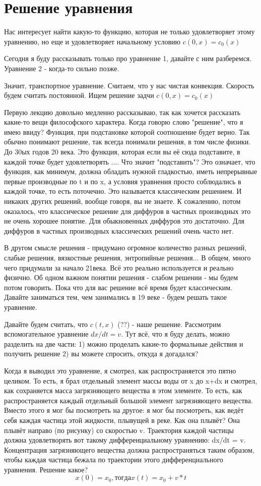 \section{Решение уравнения}
Нас интересует найти какую-то функцию, которая не только удовлетворяет этому уравнению, но еще и удовлетворяет начальному условию $c(0, x) = c_0(x)$

Сегодня я буду рассказывать только про уравнение 1, давайте с ним разберемся. Уравнение 2 - когда-то сильно позже.

Значит, транспортное уравнение. Считаем, что у нас чистая конвекция. Скорость будем считать постоянной. Ищем решение задчи $c(0,x) = c_0(x)$

Первую лекцию довольно медленно рассказываю, так как хочется рассказать какие-то вещи философского характера. Когда говорю слово "решение", что я имею ввиду? Функция, при подстановке которой соотношение будет верно. Так обычно понимают решение, так всегда понимали решения, в том числе физики. До 30ых годов 20 века. Это функция, которая если вы её сюда подставите, в каждой точке будет удовлетворять ....
Что значит "подставить"? Это означает, что функция, как минимум, должна обладать нужной гладкостью, иметь непрерывные первые производные по t и по x, а условия уравнения просто соблюдались в каждой точке, то есть поточечно. Это называется классическим решением. И никаких других решений, вообще говоря, вы не знаете. К сожалению, потом оказалось, что классическое решение для диффуров в частных производных это не очень хорошее понятие. Для обыкновенных диффуров это достаточно. Для диффуров в частных производных классических решений очень часто нет.

В другом смысле решения - придумано огромное количество разных решений, слабые решения, вязкостные решения, энтропийные решения... В общем, много чего придумали за начало 21века. Всё это реально используется и реально физично.
Об одном важном понятии решения - слабом решении - мы будем потом говорить. Пока что для вас решение всё время будет классическим. Давайте заниматься тем, чем занимались в 19 веке - будем решать такое уравнение.

Давайте будем считать, что $c(t,x)$ (??) - наше решение. Рассмотрим вспомогательное уравнение $dx/dt = v$. Тут всё, что я буду делать, можно разделить на две части:
1) можно проделать какие-то формальные действия и получить решение
2) вы можете спросить, откуда я догадался?

Когда я выводил это уравнение, я смотрел, как распространяется это пятно целиком. То есть, я брал отдельный элемент массы воды от x до x+dx и смотрел, как сохраняется масса загрязняющего вещества в этом элементе. То есть, как распространяется каждый отдельный большой элемент загрязняющего вещества. Вместо этого я мог бы посмотреть на другое: я мог бы посмотреть, как ведёт себя каждая частица этой жидкости, плывущей в реке. Как она плывёт? Она плывёт направо (по рисунку) со скоростью v. Траектория каждой частицы должна удовлетворять вот такому дифференциальному уравнению: dx/dt = v. Концентрация загрязняющего вещества должна распространяться таким образом, чтобы каждая частица бежала по траектории этого дифференциального уравнения.
Решение какое?
$$x(0) = x_0, тогда x(t) = x_0 + v * t$$

